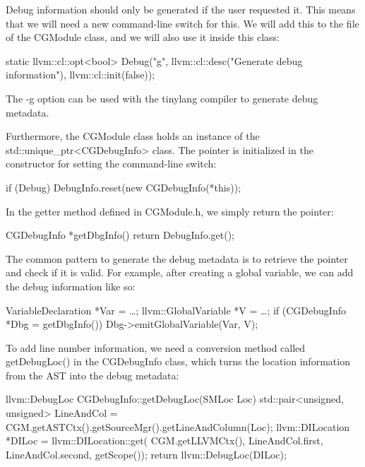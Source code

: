 Debug information should only be generated if the user requested it. This means that we will need a new command-line switch for this. We will add this to the file of the CGModule class, and we will also use it inside this class:

\begin{cpp}
static llvm::cl::opt<bool>
    Debug("g", llvm::cl::desc("Generate debug information"),
        llvm::cl::init(false));
\end{cpp}

The -g option can be used with the tinylang compiler to generate debug metadata.

Furthermore, the CGModule class holds an instance of the std::unique\_ptr<CGDebugInfo> class. The pointer is initialized in the constructor for setting the command-line switch:

\begin{cpp}
    if (Debug)
        DebugInfo.reset(new CGDebugInfo(*this));
\end{cpp}

In the getter method defined in CGModule.h, we simply return the pointer:

\begin{cpp}
CGDebugInfo *getDbgInfo() {
    return DebugInfo.get();
}
\end{cpp}

The common pattern to generate the debug metadata is to retrieve the pointer and check if it is valid. For example, after creating a global variable, we can add the debug information like so:

\begin{cpp}
VariableDeclaration *Var = …;
llvm::GlobalVariable *V = …;
if (CGDebugInfo *Dbg = getDbgInfo())
    Dbg->emitGlobalVariable(Var, V);
\end{cpp}

To add line number information, we need a conversion method called getDebugLoc() in the CGDebugInfo class, which turns the location information from the AST into the debug metadata:

\begin{cpp}
llvm::DebugLoc CGDebugInfo::getDebugLoc(SMLoc Loc) {
    std::pair<unsigned, unsigned> LineAndCol =
        CGM.getASTCtx().getSourceMgr().getLineAndColumn(Loc);
    llvm::DILocation *DILoc = llvm::DILocation::get(
        CGM.getLLVMCtx(), LineAndCol.first, LineAndCol.second,
        getScope());
    return llvm::DebugLoc(DILoc);
}
\end{cpp}

